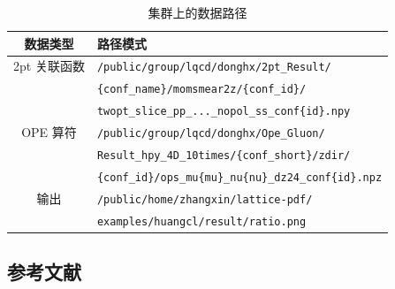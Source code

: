 \documentclass[12pt,a4paper]{ctexart}
\begin{document}
\begin{table}[H]
\centering
\caption{集群上的数据路径}
\begin{tabular}{c|l}
\toprule
\textbf{数据类型} & \textbf{路径模式} \\
\midrule
2pt 关联函数 & \texttt{/public/group/lqcd/donghx/2pt\_Result/} \\
 & \quad \texttt{\{conf\_name\}/momsmear2z/\{conf\_id\}/} \\
 & \quad \texttt{twopt\_slice\_pp\_...\_nopol\_ss\_conf\{id\}.npy} \\
\midrule
OPE 算符 & \texttt{/public/group/lqcd/donghx/Ope\_Gluon/} \\
 & \quad \texttt{Result\_hpy\_4D\_10times/\{conf\_short\}/zdir/} \\
 & \quad \texttt{\{conf\_id\}/ops\_mu\{mu\}\_nu\{nu\}\_dz24\_conf\{id\}.npz} \\
\midrule
输出 & \texttt{/public/home/zhangxin/lattice-pdf/} \\
 & \quad \texttt{examples/huangcl/result/ratio.png} \\
\bottomrule
\end{tabular}
\end{table}

\subsection{参考文献}
\end{document}
